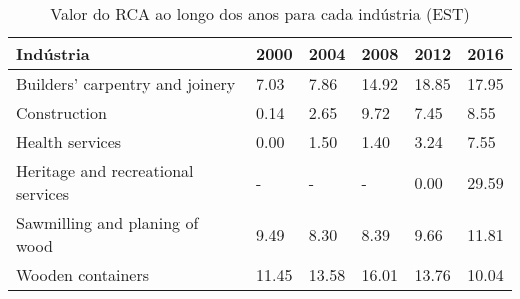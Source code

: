 \begin{table}
\centering
\caption{Valor do RCA ao longo dos anos para cada indústria (EST)}
\begin{tabular}{p{6cm}p{1.5cm}p{1.5cm}p{1.5cm}p{1.5cm}p{1.5cm}}
\toprule
                         Indústria &  2000 &  2004 &  2008 &  2012 &  2016 \\
\midrule
   Builders' carpentry and joinery &  7.03 &  7.86 & 14.92 & 18.85 & 17.95 \\
                      Construction &  0.14 &  2.65 &  9.72 &  7.45 &  8.55 \\
                   Health services &  0.00 &  1.50 &  1.40 &  3.24 &  7.55 \\
Heritage and recreational services &     - &     - &     - &  0.00 & 29.59 \\
    Sawmilling and planing of wood &  9.49 &  8.30 &  8.39 &  9.66 & 11.81 \\
                 Wooden containers & 11.45 & 13.58 & 16.01 & 13.76 & 10.04 \\
\bottomrule
\end{tabular}
\end{table}
